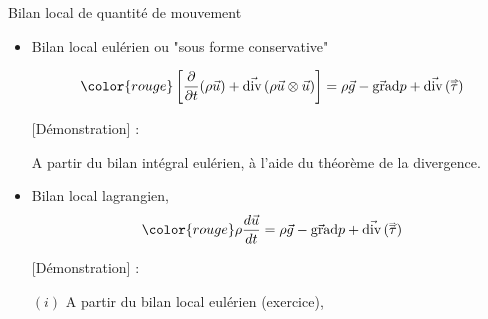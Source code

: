 \begin{frame}{Bilan local de quantité de mouvement }

\small


\medskip
\pause

\begin{itemize}
\item
  Bilan local eulérien ou "sous forme conservative"

	\begin{equation}
		\color{rouge}
		\left[ \dpdt{} (\rho \myvec{u}) +  \myvec{\divergence}(\rho \myvec{u} \otimes \myvec{u}) \right] 
		= \rho \myvec{g} - \gradient p + \myvec{\divergence}( \mytensor{\tau} )
		\label{eq:bilan_local_eulerien_qdm}
	\end{equation}

\pause 
\medskip

{\color{vert} [Démonstration] :}

 A partir du bilan intégral eulérien, à l'aide du théorème de la divergence.

\pause
\medskip

\item
	Bilan local lagrangien, 
	\begin{equation}
	\color{rouge}
		\rho \ddt{\myvec{u}} 
		= 
		\rho \myvec{g}  - \gradient p + \myvec{\divergence}( \mytensor{\tau})
	\end{equation}
	
	\medskip

\pause
\medskip

{\color{vert} [Démonstration] :}

$(i)$ A partir du bilan local eulérien (exercice), 


\end{itemize}
\end{frame}

